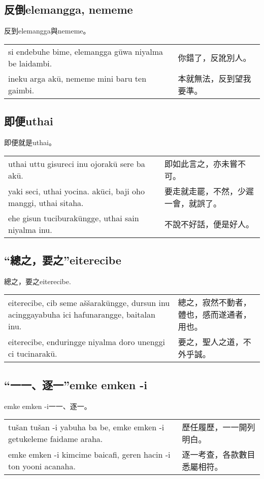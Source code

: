 \documentclass{article}
\begin{document}
\subsection{反倒elemangga, nememe}
\noindent 反到elemangga與nememe。
\begin{center}
    \begin{tabularx}{\textwidth}{XX}
        si endebuhe bime, elemangga g\={u}wa niyalma be laidambi. & 你錯了，反訛別人。\\
        ineku arga ak\={u}, nememe mini baru ten gaimbi. & 本就無法，反到望我要準。
    \end{tabularx}
\end{center}

\subsection{即便uthai}
\noindent 即便就是uthai。
\begin{center}
    \begin{tabularx}{\textwidth}{XX}
        uthai uttu gisureci inu ojorak\={u} sere ba ak\={u}. & 即如此言之，亦未嘗不可。\\
        yaki seci, uthai yocina. ak\={u}ci, baji oho manggi, uthai sitaha. & 要走就走罷，不然，少遲一會，就誤了。\\
        ehe gisun tuciburak\={u}ngge, uthai sain niyalma inu. & 不說不好話，便是好人。
    \end{tabularx}
\end{center}

\subsection{“總之，要之”eiterecibe}
\noindent 總之，要之eiterecibe.
\begin{center}
    \begin{tabularx}{\textwidth}{XX}
        eiterecibe, cib seme a\v{s}\v{s}arak\={u}ngge, dursun inu acinggayabuha ici hafunarangge, baitalan inu. & 總之，寂然不動者，體也，感而遂通者，用也。\\
        eiterecibe, enduringge niyalma doro unenggi ci tucinarak\={u}. & 要之，聖人之道，不外乎誠。
    \end{tabularx}
\end{center}

\subsection{“一一、逐一”emke emken -i}
\noindent emke emken -i一一、逐一。
\begin{center}
    \begin{tabularx}{\textwidth}{XX}
        tu\v{s}an tu\v{s}an -i yabuha ba be, emke emken -i getukeleme faidame araha. & 歷任履歷，一一開列明白。\\
        emke emken -i kimcime baicafi, geren hacin -i ton yooni acanaha.& 逐一考查，各款數目悉屬相符。
    \end{tabularx}
\end{center}
\end{document}
